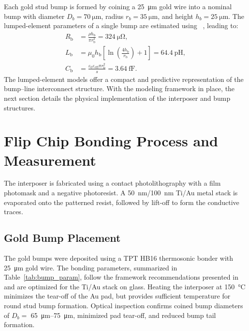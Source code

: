 \documentclass[conference,a4paper]{IEEEtran}
\begin{document}
Each gold stud bump is formed by coining a \SI{25}{\micro\meter} gold wire into a nominal bump with diameter $D_b = \SI{70}{\micro\meter}$, radius $r_b=\SI{35}{\micro\meter}$, and height $h_b = \SI{25}{\micro\meter}$. The lumped-element parameters of a single bump are estimated using ~\cite{Simons2004, Grover2009,Paul1994}, leading to:
\begin{align}
    R_{\text{b}}&=\frac{\rho h_{\text{b}}}{\pi r_{\text{b}}^{2}}=\SI{324}{\micro\ohm},\\
    L_{\text{b}}&=\mu_{0}h_{\text{b}}\left[\ln\left(\frac{4h_{\text{b}}}{r_{\text{b}}}\right)+1\right]=\SI{64.4}{\pico\henry},\\
    C_{\text{b}}&=\frac{\varepsilon_{0}\varepsilon_{\text{eff}}\pi r_{\text{b}}^{2}}{s} =\SI{3.64}{\femto\farad}.
\end{align}
%
The lumped-element models offer a compact and predictive representation of the bump–line interconnect structure. With the modeling framework in place, the next section details the physical implementation of the interposer and bump structures.

\section{Flip Chip Bonding Process and Measurement}\label{sec:fabrication}
The interposer is fabricated using a contact photolithography with a film photomask and a negative photoresist. A \SI{50}{\nano\meter}/\SI{100}{\nano\meter} Ti/Au metal stack is evaporated onto the patterned resist, followed by lift-off to form the conductive traces.

\subsection{Gold Bump Placement}\label{subsec:gold_bump}
The gold bumps were deposited using a TPT HB16 thermosonic bonder with \SI{25}{\micro\metre} gold wire. The bonding parameters, summarized in Table~\ref {tab:bump_param}, follow the framework recommendations presented in \cite{Jordan2002} and are optimized for the Ti/Au stack on glass. Heating the interposer at \SI{150}{\celsius} minimizes the tear-off of the Au pad, but provides sufficient temperature for round stud bump formation. Optical inspection confirms coined bump diameters of $D_b =$ \SIrange{65}{75}{\micro\meter}, minimized pad tear-off, and reduced bump tail formation.
\end{document}

